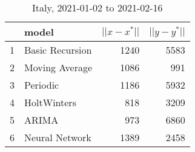 \begin{table}[H]
\centering
\begin{tabular}{rlrr}
  \hline
 & model & $||x-x^*||$ & $||y-y^*||$ \\ 
  \hline
1 & Basic Recursion & 1240 & 5583 \\ 
  2 & Moving Average & 1086 & 991 \\ 
  3 & Periodic & 1186 & 5932 \\ 
  4 & HoltWinters & 818 & 3209 \\ 
  5 & ARIMA & 973 & 6860 \\ 
  6 & Neural Network & 1389 & 2458 \\ 
   \hline
\end{tabular}
\caption{Italy, 2021-01-02 to 2021-02-16} 
\label{fig:Italysummarydf}
\end{table}

